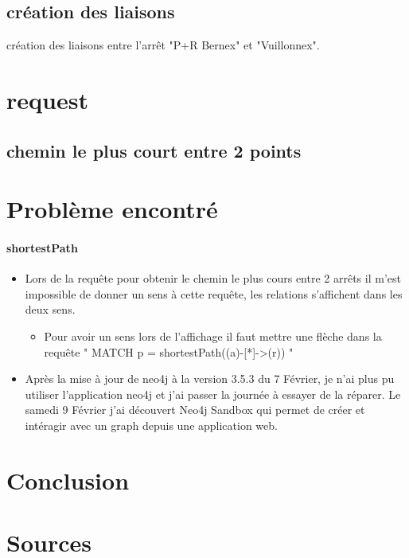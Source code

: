\documentclass[a4paper,12pt]{article}
\begin{document}
\subsection{création des liaisons}
création des liaisons entre l'arrêt "P+R Bernex" et "Vuillonnex".

\section{request}
    \subsection{chemin le plus court entre 2 points}
    
\section{Problème encontré}
\paragraph{shortestPath}
\begin{itemize}
    \item Lors de la requête pour obtenir le chemin le plus cours entre 2 arrêts il m'est impossible de donner un sens à cette requête, les relations s'affichent dans les deux sens.
    \begin{itemize}
        \item Pour avoir un sens lors de l'affichage il faut mettre une flèche dans la requête " MATCH p = shortestPath((a)-[*]->(r)) " 
    \end{itemize}
    \item Après la mise à jour de neo4j à la version 3.5.3 du 7 Février, je n'ai plus pu utiliser l'application neo4j et j'ai passer la journée à essayer de la réparer.
    Le samedi 9 Février j'ai découvert Neo4j Sandbox qui permet de créer et intéragir avec un graph depuis une application web.

\end{itemize}
 
\section{Conclusion}
\section{Sources}

\end{document}
